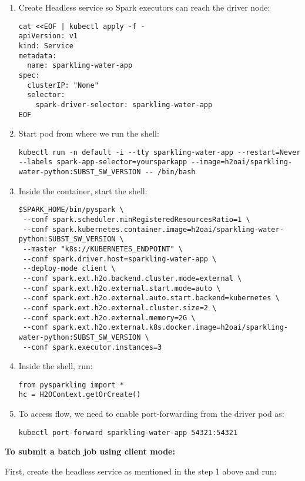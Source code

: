 \begin{enumerate}
    \item Create Headless service so Spark executors can reach the driver node:
    \begin{lstlisting}[style=Bash]
cat <<EOF | kubectl apply -f -
apiVersion: v1
kind: Service
metadata:
  name: sparkling-water-app
spec:
  clusterIP: "None"
  selector:
    spark-driver-selector: sparkling-water-app
EOF
    \end{lstlisting}
    \item Start pod from where we run the shell:
    \begin{lstlisting}[style=Bash]
kubectl run -n default -i --tty sparkling-water-app --restart=Never --labels spark-app-selector=yoursparkapp --image=h2oai/sparkling-water-python:SUBST_SW_VERSION -- /bin/bash
    \end{lstlisting}
    \item Inside the container, start the shell:
    \begin{lstlisting}[style=Bash]
$SPARK_HOME/bin/pyspark \
 --conf spark.scheduler.minRegisteredResourcesRatio=1 \
 --conf spark.kubernetes.container.image=h2oai/sparkling-water-python:SUBST_SW_VERSION \
 --master "k8s://KUBERNETES_ENDPOINT" \
 --conf spark.driver.host=sparkling-water-app \
 --deploy-mode client \
 --conf spark.ext.h2o.backend.cluster.mode=external \
 --conf spark.ext.h2o.external.start.mode=auto \
 --conf spark.ext.h2o.external.auto.start.backend=kubernetes \
 --conf spark.ext.h2o.external.cluster.size=2 \
 --conf spark.ext.h2o.external.memory=2G \
 --conf spark.ext.h2o.external.k8s.docker.image=h2oai/sparkling-water-python:SUBST_SW_VERSION \
 --conf spark.executor.instances=3
    \end{lstlisting}
    \item Inside the shell, run:
    \begin{lstlisting}[style=Python]
from pysparkling import *
hc = H2OContext.getOrCreate()
    \end{lstlisting}
    \item To access flow, we need to enable port-forwarding from the driver pod as:
    \begin{lstlisting}[style=Bash]
kubectl port-forward sparkling-water-app 54321:54321
    \end{lstlisting}
\end{enumerate}


\textbf{To submit a batch job using client mode:}

First, create the headless service as mentioned in the step 1 above and run:

